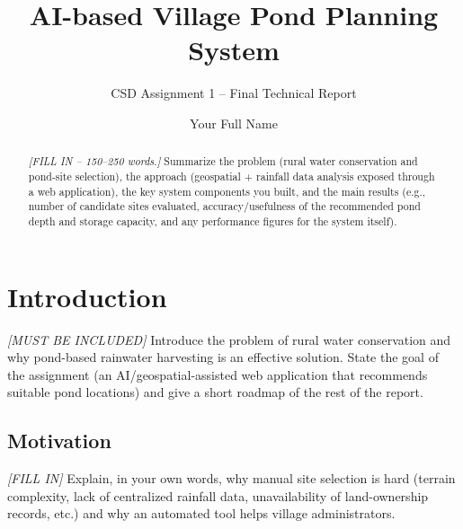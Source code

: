 \documentclass[manuscript,screen,review]{acmart}
\begin{document}
\title{AI-based Village Pond Planning System}
\subtitle{CSD Assignment 1 -- Final Technical Report}

\author{Your Full Name}


\renewcommand{\shortauthors}{Your Surname et al.}

\begin{abstract}
\textit{[FILL IN -- 150--250 words.]} Summarize the problem (rural
water conservation and pond-site selection), the approach (geospatial
+ rainfall data analysis exposed through a web application), the key
system components you built, and the main results (e.g., number of
candidate sites evaluated, accuracy/usefulness of the recommended
pond depth and storage capacity, and any performance figures for the
system itself).
\end{abstract}


\maketitle

\section{Introduction}
\label{sec:intro}
\textit{[MUST BE INCLUDED]} Introduce the problem of rural water conservation
and why pond-based rainwater harvesting is an effective solution.
State the goal of the assignment (an AI/geospatial-assisted web
application that recommends suitable pond locations) and give a short
roadmap of the rest of the report.

\subsection{Motivation}
\textit{[FILL IN]} Explain, in your own words, why manual site
selection is hard (terrain complexity, lack of centralized rainfall
data, unavailability of land-ownership records, etc.) and why an
automated tool helps village administrators.
\end{document}
